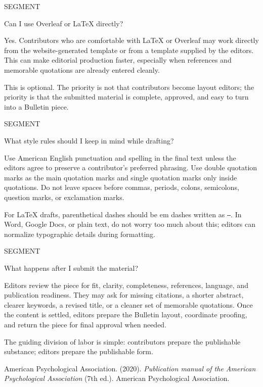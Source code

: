 \documentclass[11pt]{article}
\newcommand{\GuideSansLight}{\sffamily}
\newcommand{\GuideSansRegular}{\sffamily}
\newcommand{\GuideSerif}{\rmfamily}
\newcounter{guideprompt}
\newcommand{\guidePrompt}[1]{%
  \Needspace{7\baselineskip}%
  \stepcounter{guideprompt}%
  \par\vspace{1.25em}%
  {\GuideSansLight\fontsize{9}{11}\selectfont\color{aliusgray}\MakeUppercase{Segment \theguideprompt}}\par
  {\GuideSansRegular\fontsize{17}{21}\selectfont\color{aliusgreen}#1\par}
  \vspace{0.35em}
}
\newenvironment{guideAnswerBlock}
  {\begingroup\GuideSerif\fontsize{12.4}{16.8}\selectfont\setlength{\parskip}{0.55em}\color{black}}
  {\par\endgroup}
\begin{document}
\guidePrompt{Can I use Overleaf or LaTeX directly?}
\begin{guideAnswerBlock}
Yes. Contributors who are comfortable with LaTeX or Overleaf may work directly from the website-generated template or from a template supplied by the editors. This can make editorial production faster, especially when references and memorable quotations are already entered cleanly.

This is optional. The priority is not that contributors become layout editors; the priority is that the submitted material is complete, approved, and easy to turn into a Bulletin piece.
\end{guideAnswerBlock}

\guidePrompt{What style rules should I keep in mind while drafting?}
\begin{guideAnswerBlock}
Use American English punctuation and spelling in the final text unless the editors agree to preserve a contributor's preferred phrasing. Use double quotation marks as the main quotation marks and single quotation marks only inside quotations. Do not leave spaces before commas, periods, colons, semicolons, question marks, or exclamation marks.

For LaTeX drafts, parenthetical dashes should be em dashes written as \texttt{---}. In Word, Google Docs, or plain text, do not worry too much about this; editors can normalize typographic details during formatting.
\end{guideAnswerBlock}

\guidePrompt{What happens after I submit the material?}
\begin{guideAnswerBlock}
Editors review the piece for fit, clarity, completeness, references, language, and publication readiness. They may ask for missing citations, a shorter abstract, clearer keywords, a revised title, or a cleaner set of memorable quotations. Once the content is settled, editors prepare the Bulletin layout, coordinate proofing, and return the piece for final approval when needed.

The guiding division of labor is simple: contributors prepare the publishable substance; editors prepare the publishable form.
\end{guideAnswerBlock}


\begin{guideAnswerBlock}
American Psychological Association. (2020). \emph{Publication manual of the American Psychological Association} (7th ed.). American Psychological Association.
\end{guideAnswerBlock}
\end{document}
